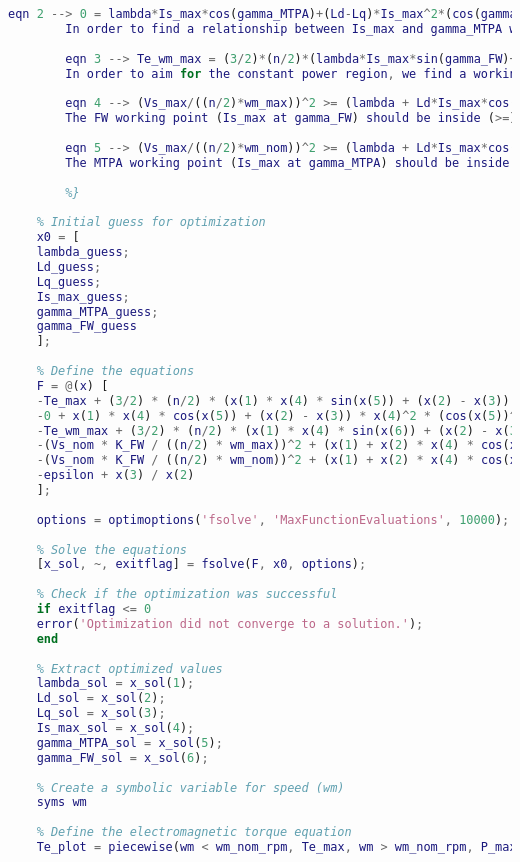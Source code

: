\begin{lstlisting}[language=Matlab, basicstyle=\ttfamily\small, breaklines=true, frame=single]
		eqn 2 --> 0 = lambda*Is_max*cos(gamma_MTPA)+(Ld-Lq)*Is_max^2*(cos(gamma_MTPA)^2-sin(gamma_MTPA)^2)
		In order to find a relationship between Is_max and gamma_MTPA we write the condition for MTPA: dTe/dgamma = 0
		
		eqn 3 --> Te_wm_max = (3/2)*(n/2)*(lambda*Is_max*sin(gamma_FW)+(Ld-Lq)*Is_max^2*sin(gamma_FW)*cos(gamma_FW))
		In order to aim for the constant power region, we find a working point in which Is_max at gamma_FW gives Te_wm_max
		
		eqn 4 --> (Vs_max/((n/2)*wm_max))^2 >= (lambda + Ld*Is_max*cos(gamma_FW))^2 + (Lq*Is_max*sin(gamma_FW))^2
		The FW working point (Is_max at gamma_FW) should be inside (>=) the voltage ellipse at wm_max 
		
		eqn 5 --> (Vs_max/((n/2)*wm_nom))^2 >= (lambda + Ld*Is_max*cos(gamma_MTPA))^2 + (Lq*Is_max*sin(gamma_MTPA))^2
		The MTPA working point (Is_max at gamma_MTPA) should be inside (>=) the voltage ellipse at wm_nom
		
		%}
	
	% Initial guess for optimization
	x0 = [
	lambda_guess;
	Ld_guess;
	Lq_guess;
	Is_max_guess;
	gamma_MTPA_guess;
	gamma_FW_guess
	];
	
	% Define the equations
	F = @(x) [
	-Te_max + (3/2) * (n/2) * (x(1) * x(4) * sin(x(5)) + (x(2) - x(3)) * x(4)^2 * sin(x(5)) * cos(x(5)));
	-0 + x(1) * x(4) * cos(x(5)) + (x(2) - x(3)) * x(4)^2 * (cos(x(5))^2 - sin(x(5))^2);
	-Te_wm_max + (3/2) * (n/2) * (x(1) * x(4) * sin(x(6)) + (x(2) - x(3)) * x(4)^2 * sin(x(6)) * cos(x(6)));
	-(Vs_nom * K_FW / ((n/2) * wm_max))^2 + (x(1) + x(2) * x(4) * cos(x(6)))^2 + (x(3) * x(4) * sin(x(6)))^2;
	-(Vs_nom * K_FW / ((n/2) * wm_nom))^2 + (x(1) + x(2) * x(4) * cos(x(5)))^2 + (x(3) * x(4) * sin(x(5)))^2;
	-epsilon + x(3) / x(2)
	];
	
	options = optimoptions('fsolve', 'MaxFunctionEvaluations', 10000);
	
	% Solve the equations
	[x_sol, ~, exitflag] = fsolve(F, x0, options);
	
	% Check if the optimization was successful
	if exitflag <= 0
	error('Optimization did not converge to a solution.');
	end
	
	% Extract optimized values
	lambda_sol = x_sol(1);
	Ld_sol = x_sol(2);
	Lq_sol = x_sol(3);
	Is_max_sol = x_sol(4);
	gamma_MTPA_sol = x_sol(5);
	gamma_FW_sol = x_sol(6);
	
	% Create a symbolic variable for speed (wm)
	syms wm
	
	% Define the electromagnetic torque equation
	Te_plot = piecewise(wm < wm_nom_rpm, Te_max, wm > wm_nom_rpm, P_max / (wm * 2 * pi / 60));
	

\end{lstlisting}
